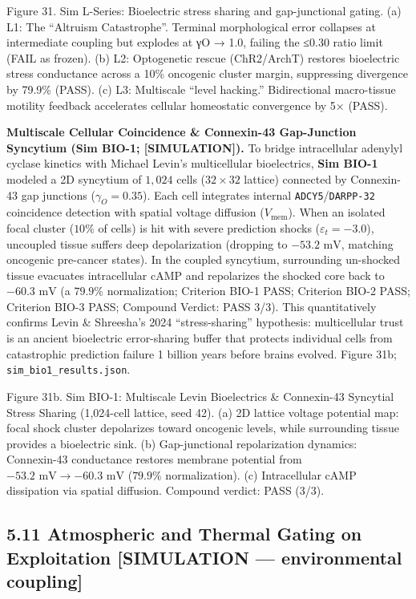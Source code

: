 \documentclass[
]{article}
\begin{document}
Figure 31. Sim L-Series: Bioelectric stress sharing and gap-junctional
gating. (a) L1: The ``Altruism Catastrophe''. Terminal morphological
error collapses at intermediate coupling but explodes at {γO → 1.0},
failing the {≤0.30} ratio limit (FAIL as frozen). (b) L2: Optogenetic
rescue (ChR2/ArchT) restores bioelectric stress conductance across a
10\% oncogenic cluster margin, suppressing divergence by 79.9\% (PASS).
(c) L3: Multiscale ``level hacking.'' Bidirectional macro-tissue
motility feedback accelerates cellular homeostatic convergence by 5×
(PASS).

\textbf{Multiscale Cellular Coincidence \& Connexin-43 Gap-Junction
Syncytium (Sim BIO-1; {[}SIMULATION{]}).} To bridge intracellular
adenylyl cyclase kinetics with Michael Levin's multicellular
bioelectrics, \textbf{Sim BIO-1} modeled a 2D syncytium of \(1,024\)
cells (\(32 \times 32\) lattice) connected by Connexin-43 gap junctions
(\(\gamma_O = 0.35\)). Each cell integrates internal
\texttt{ADCY5}/\texttt{DARPP-32} coincidence detection with spatial
voltage diffusion (\(V_{\mathrm{mem}}\)). When an isolated focal cluster
(\(10\%\) of cells) is hit with severe prediction shocks
(\(\varepsilon_t = -3.0\)), uncoupled tissue suffers deep depolarization
(dropping to \(-53.2\text{ mV}\), matching oncogenic pre-cancer states).
In the coupled syncytium, surrounding un-shocked tissue evacuates
intracellular cAMP and repolarizes the shocked core back to
\(-60.3\text{ mV}\) (a \(79.9\%\) normalization; Criterion BIO-1 PASS;
Criterion BIO-2 PASS; Criterion BIO-3 PASS; Compound Verdict: PASS 3/3).
This quantitatively confirms Levin \& Shreesha's 2024 ``stress-sharing''
hypothesis: multicellular trust is an ancient bioelectric error-sharing
buffer that protects individual cells from catastrophic prediction
failure 1 billion years before brains evolved. Figure 31b;
\texttt{sim\_bio1\_results.json}.

Figure 31b. Sim BIO-1: Multiscale Levin Bioelectrics \& Connexin-43
Syncytial Stress Sharing (1,024-cell lattice, seed 42). (a) 2D lattice
voltage potential map: focal shock cluster depolarizes toward oncogenic
levels, while surrounding tissue provides a bioelectric sink. (b)
Gap-junctional repolarization dynamics: Connexin-43 conductance restores
membrane potential from \(-53.2\text{ mV} \to -60.3\text{ mV}\)
(\(79.9\%\) normalization). (c) Intracellular cAMP dissipation via
spatial diffusion. Compound verdict: PASS (3/3).

\subsection{5.11 Atmospheric and Thermal Gating on Exploitation
{[}SIMULATION --- environmental
coupling{]}}\label{atmospheric-and-thermal-gating-on-exploitation-simulation-environmental-coupling}
\end{document}
